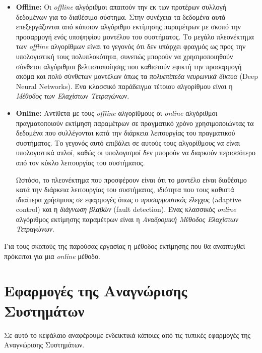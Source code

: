 \begin{itemize}
	\item{\textbf{Offline:} Οι \textit{offline} αλγόριθμοι απαιτούν την εκ των προτέρων συλλογή δεδομένων για το διαθέσιμο σύστημα. Στην συνέχεια τα δεδομένα αυτά επεξεργάζονται από κάποιον αλγόριθμο εκτίμησης παραμέτρων με σκοπό την προσαρμογή ενός υποψηφίου μοντέλου του συστήματος. Το μεγάλο πλεονέκτημα των \textit{offline} αλγορίθμων είναι το γεγονός ότι δεν υπάρχει φραγμός ως προς την υπολογιστική τους πολυπλοκότητα, συνεπώς μπορούν να χρησιμοποιηθούν σύνθετοι αλγόριθμοι βελτιστοποίησης που καθιστούν εφικτή την προσαρμογή ακόμα και πολύ σύνθετων μοντέλων όπως τα \textit{πολυεπίπεδα νευρωνικά δίκτυα} (Deep Neural Networks). Ένα κλασσικό παράδειγμα τέτοιου αλγορίθμου είναι η \textit{Μέθοδος των Ελαχίστων Τετραγώνων}.
	}
		
	\item{\textbf{Online:} Αντίθετα με τους \textit{offline} αλγορίθμους οι \textit{online} αλγόριθμοι πραγματοποιούν εκτίμηση παραμέτρων σε πραγματικό χρόνο χρησιμοποιώντας τα δεδομένα που συλλέγονται κατά την διάρκεια λειτουργίας του πραγματικού συστήματος. Το γεγονός αυτό επιβάλει σε αυτούς τους αλγορίθμους να είναι υπολογιστικά απλοί, καθώς οι υπολογισμοί δεν μπορούν να διαρκούν περισσότερο από τον κύκλο λειτουργίας του συστήματος. 
		
	Ωστόσο, το πλεονέκτημα που προσφέρουν είναι ότι το μοντέλο είναι διαθέσιμο κατά την διάρκεια λειτουργίας του συστήματος, ιδιότητα που τους καθιστά ιδιαίτερα χρήσιμους σε εφαρμογές όπως ο \textit{προσαρμοστικός έλεγχος} (adaptive control) και η \textit{διάγνωση βλαβών} (fault detection). Ένας κλασσικός \textit{online} αλγόριθμος εκτίμησης παραμέτρων είναι η \textit{Αναδρομική Μέθοδος Ελαχίστων Τετραγώνων}.
	}
\end{itemize}

Για τους σκοπούς της παρούσας εργασίας η μέθοδος εκτίμησης που θα αναπτυχθεί πρόκειται για μια \textit{online} μέθοδο.

\section{Εφαρμογές της Αναγνώρισης Συστημάτων}
Σε αυτό το κεφάλαιο αναφέρουμε ενδεικτικά κάποιες από τις  τυπικές εφαρμογές της Αναγνώρισης Συστημάτων.

